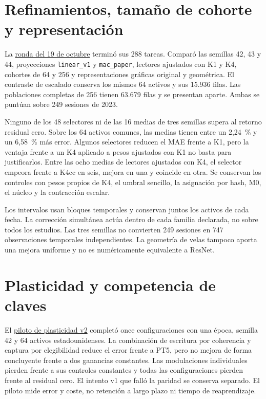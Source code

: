 \documentclass[11pt,a4paper]{report}
\begin{document}
\section{Refinamientos, tamaño de cohorte y representación}
La \href{https://github.com/GonxKZ/mars-titan/blob/8b7e2a5600be568cc1299f2a661da15b5090c45e/reports/research/refinement-development-20261019/completed-v1/README.md}{ronda del 19 de octubre}
terminó sus 288 tareas. Comparó las semillas 42, 43 y 44, proyecciones
\texttt{linear\_v1} y \texttt{mac\_paper}, lectores ajustados con K1 y K4,
cohortes de 64 y 256 y representaciones gráficas original y geométrica.
El contraste de escalado conserva los mismos 64 activos y sus 15.936 filas.
Las poblaciones completas de 256 tienen 63.679 filas y se presentan aparte.
Ambas se puntúan sobre 249 sesiones de 2023.

Ninguno de los 48 selectores ni de las 16 medias de tres semillas supera al
retorno residual cero. Sobre los 64 activos comunes, las medias tienen entre
un 2,24~\% y un 6,58~\% más error. Algunos selectores reducen el MAE frente a
K1, pero la ventaja frente a un K4 aplicado a pesos ajustados con K1 no basta
para justificarlos. Entre las ocho medias de lectores ajustados con K4, el
selector empeora frente a K4cc en seis, mejora en una y coincide en otra.
Se conservan los controles con pesos propios de K4, el umbral sencillo, la
asignación por hash, M0, el núcleo y la contracción escalar.

Los intervalos usan bloques temporales y conservan juntos los activos de cada
fecha. La corrección simultánea actúa dentro de cada familia declarada, no
sobre todos los estudios. Las tres semillas no convierten 249 sesiones en
747 observaciones temporales independientes. La geometría de velas tampoco
aporta una mejora uniforme y no es numéricamente equivalente a ResNet.

\section{Plasticidad y competencia de claves}
El \href{https://github.com/GonxKZ/mars-titan/blob/8b7e2a5600be568cc1299f2a661da15b5090c45e/reports/research/neural-plasticity-20261020/development-v2/README.md}{piloto de plasticidad v2}
completó once configuraciones con una época, semilla 42 y 64 activos
estadounidenses. La combinación de escritura por coherencia y captura por
elegibilidad reduce el error frente a PT5, pero no mejora de forma concluyente
frente a dos ganancias constantes. Las modulaciones individuales pierden
frente a sus controles constantes y todas las configuraciones pierden frente
al residual cero. El intento v1 que falló la paridad se conserva separado.
El piloto mide error y coste, no retención a largo plazo ni tiempo de
reaprendizaje.
\end{document}
